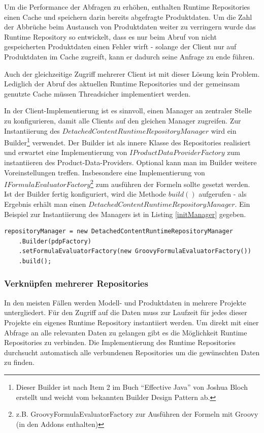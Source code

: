 \documentclass[headsepline=true, footsepline=true]{scrartcl}
\begin{document}
Um die Performance der Abfragen zu erhöhen, enthalten Runtime Repositories einen
Cache und speichern darin bereits abgefragte Produktdaten. Um die Zahl der
Abbrüche beim Austausch von Produktdaten weiter zu verringern wurde das Runtime
Repository so entwickelt, dass es nur beim Abruf von nicht gespeicherten
Produktdaten einen Fehler wirft - solange der Client nur auf Produktdaten im
Cache zugreift, kann er dadurch seine Anfrage zu ende führen.

Auch der gleichzeitige Zugriff mehrerer Client ist mit dieser Lösung kein
Problem. Lediglich der Abruf des aktuellen Runtime Repositories und der gemeinsam
genutzte Cache müssen Threadsicher implementiert werden.

In der Client-Implementierung ist es sinnvoll, einen Manager an zentraler Stelle
zu konfigurieren, damit alle Clients auf den gleichen Manager zugreifen. Zur
Instantiierung des $DetachedContentRuntimeRepositoryManager$ wird ein
Builder\footnote{Dieser Builder ist nach Item 2 im Buch "`Effective Java"' von
Joshua Bloch \cite{effectiveJava} erstellt und weicht vom bekannten Builder
Design Pattern ab.} verwendet. Der Builder ist als innere Klasse des
Repositories realisiert und erwartet eine Implementierung von $IProductDataProviderFactory$ zum instantiieren des Product-Data-Providers. Optional kann man im Builder weitere Voreinstellungen treffen.
Insbesondere eine Implementierung von $IFormulaEvaluatorFactory$\footnote{z.B.
GroovyFormulaEvaluatorFactory zur Ausführen der Formeln mit Groovy (in den
Addons enthalten)} zum ausführen der Formeln sollte gesetzt werden. Ist der
Builder fertig konfiguriert, wird die Methode $build()$ aufgerufen - als Ergebnis erhält man einen $DetachedContentRuntimeRepositoryManager$. Ein
Beispiel zur Instantiierung des Managers ist in Listing \ref{initManager}
gegeben.

\begin{lstlisting}[caption=Initialize DetachedContentRuntimeRepositoryManager,
label=initManager]
repositoryManager = new DetachedContentRuntimeRepositoryManager
	.Builder(pdpFactory)
	.setFormulaEvaluatorFactory(new GroovyFormulaEvaluatorFactory())
	.build();
\end{lstlisting}

\subsubsection{Verknüpfen mehrerer Repositories}

In den meisten Fällen werden Modell- und Produktdaten in mehrere Projekte
untergliedert. Für den Zugriff auf die Daten muss zur Laufzeit für jedes dieser
Projekte ein eigenes Runtime Repository instantiiert werden. Um direkt mit einer
Abfrage an alle relevanten Daten zu gelangen gibt es die Möglichkeit Runtime
Repositories zu verbinden. Die Implementierung des Runtime Repositories
durchsucht automatisch alle verbundenen Repositories um die gewünschten Daten zu
finden.
\end{document}
